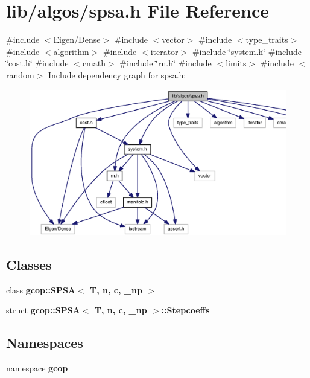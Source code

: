 \section{lib/algos/spsa.h \-File \-Reference}
\label{spsa_8h}
{\ttfamily \#include $<$\-Eigen/\-Dense$>$}\*
{\ttfamily \#include $<$vector$>$}\*
{\ttfamily \#include $<$type\-\_\-traits$>$}\*
{\ttfamily \#include $<$algorithm$>$}\*
{\ttfamily \#include $<$iterator$>$}\*
{\ttfamily \#include \char`\"{}system.\-h\char`\"{}}\*
{\ttfamily \#include \char`\"{}cost.\-h\char`\"{}}\*
{\ttfamily \#include $<$cmath$>$}\*
{\ttfamily \#include \char`\"{}rn.\-h\char`\"{}}\*
{\ttfamily \#include $<$limits$>$}\*
{\ttfamily \#include $<$random$>$}\*
\-Include dependency graph for spsa.\-h\-:
\nopagebreak
\begin{figure}[H]
\begin{center}
\leavevmode
\includegraphics[width=350pt]{spsa_8h__incl}
\end{center}
\end{figure}
\subsection*{\-Classes}
\begin{DoxyCompactItemize}
\item 
class {\bf gcop\-::\-S\-P\-S\-A$<$ T, n, c, \-\_\-np $>$}
\item 
struct {\bf gcop\-::\-S\-P\-S\-A$<$ T, n, c, \-\_\-np $>$\-::\-Stepcoeffs}
\end{DoxyCompactItemize}
\subsection*{\-Namespaces}
\begin{DoxyCompactItemize}
\item 
namespace {\bf gcop}
\end{DoxyCompactItemize}
